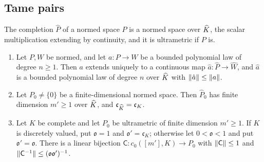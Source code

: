 \subsection{Tame pairs}\label{amb:ssec:proofs-tame}

The completion $\widehat P$ of a normed space $P$ is a normed space over $\widehat K$, the scalar multiplication extending by
continuity, and it is ultrametric if $P$ is.

\begin{lemma}[coordinates]\label{amb:lem:coordinates}
\leavevmode
\begin{enumerate}
\item Let $P,W$ be normed, and let $a\colon P\to W$ be a bounded polynomial law of degree $n\ge1$. Then $a$
extends uniquely to a continuous map $\hat a\colon\widehat P\to\widehat W$, and $\hat a$ is a bounded polynomial law of
degree $n$ over $\widehat K$ with $\lVert \hat a\rVert\le\lVert a\rVert$.
\item Let $P_0\ne\{0\}$ be a finite-dimensional normed space. Then $\widehat P_0$ has finite dimension $m'\ge1$ over
$\widehat K$, and $\mathfrak c_{\widehat K}=\mathfrak c_K$.
\item Let $K$ be complete and let $P_0$ be ultrametric of finite dimension $m'\ge1$. If $K$ is discretely valued, put
$\mathfrak o=1$ and $\mathfrak o'=\mathfrak c_K$; otherwise let $0<\mathfrak o<1$ and put $\mathfrak o'=\mathfrak o$. There
is a linear bijection $\mathsf C\colon c_0([m'],K)\to P_0$ with $\lVert \mathsf C\rVert\le1$ and
$\lVert \mathsf C^{-1}\rVert\le(\mathfrak o\mathfrak o')^{-1}$.
\end{enumerate}
\end{lemma}

